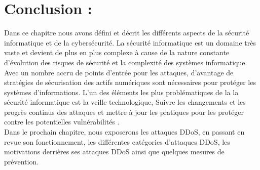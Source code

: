 \section{Conclusion : }
Dans ce chapitre nous avons défini et décrit les différents aspects de la sécurité informatique et de la cybersécurité. La sécurité informatique est un domaine très vaste et devient de plus en plus complexe à cause de la nature constante d’évolution des risques de sécurité et la complexité des systèmes informatique.
Avec un nombre accru de points d'entrée pour les attaques, d'avantage de stratégies de sécurisation des actifs numériques sont nécessaires pour protéger les systèmes d'informations. L'un des éléments les plus problématiques de la la sécurité informatique est la veille technologique, Suivre les changements et les progrès continus des attaques et mettre à jour les pratiques pour les protéger contre les potentielles vulnérabilités .\\

Dans le prochain chapitre, nous exposerons les attaques DDoS, en passant en revue son fonctionnement, les différentes catégories d’attaques DDoS, les motivations derrières ses attaques DDoS ainsi que quelques mesures de prévention.
 







